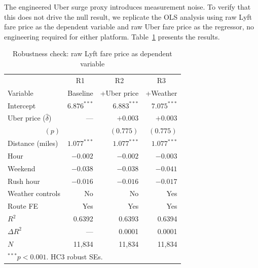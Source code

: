\documentclass[11pt, letterpaper]{article}
\begin{document}
The engineered Uber surge proxy introduces measurement noise. To verify
that this does not drive the null result, we replicate the OLS analysis
using raw Lyft fare price as the dependent variable and raw Uber fare
price as the regressor, no engineering required for either platform.
Table~\ref{tab:robustness} presents the results.

\begin{table}[H]
  \centering
  \caption{Robustness check: raw Lyft fare price as dependent variable}
  \label{tab:robustness}
  \begin{tabular}{lrrr}
    \toprule
    & \multicolumn{1}{c}{R1} & \multicolumn{1}{c}{R2} &
      \multicolumn{1}{c}{R3} \\
    Variable & Baseline & +Uber price & +Weather \\
    \midrule
    Intercept                              & $6.876^{***}$ & $6.883^{***}$ & $7.075^{***}$ \\
    Uber price ($\hat{\delta}$)            & ---           & $+0.003$      & $+0.003$ \\
    \multicolumn{1}{r}{\footnotesize$(p)$} &               & \footnotesize$(0.775)$
                                                           & \footnotesize$(0.775)$ \\
    Distance (miles)                       & $1.077^{***}$ & $1.077^{***}$ & $1.077^{***}$ \\
    Hour                                   & $-0.002$      & $-0.002$      & $-0.003$ \\
    Weekend                                & $-0.038$      & $-0.038$      & $-0.041$ \\
    Rush hour                              & $-0.016$      & $-0.016$      & $-0.017$ \\
    Weather controls                       & No            & No            & Yes \\
    Route FE                               & Yes           & Yes           & Yes \\
    \midrule
    $R^2$                                  & 0.6392        & 0.6393        & 0.6394 \\
    $\Delta R^2$                           & ---           & 0.0001        & 0.0001 \\
    $N$                                    & 11,834        & 11,834        & 11,834 \\
    \bottomrule
    \multicolumn{4}{l}{\footnotesize $^{***}p<0.001$. HC3 robust SEs.}
  \end{tabular}
\end{table}
\end{document}
